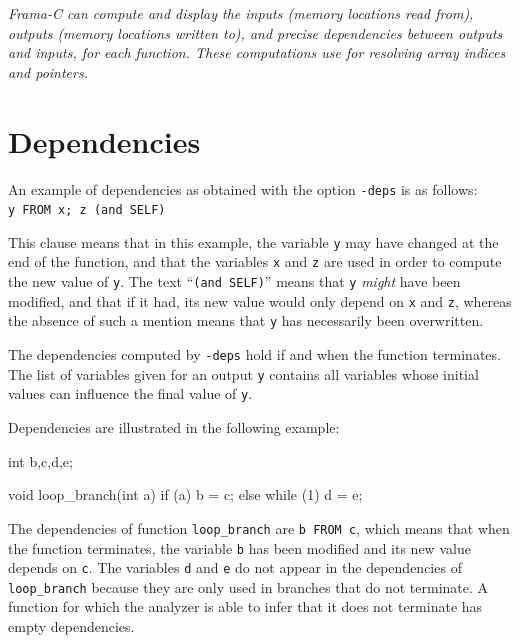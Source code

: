 \documentclass{frama-c-book}
\begin{document}
{\em Frama-C can compute and display the inputs (memory locations read from),
outputs (memory locations written to),
and precise dependencies between outputs and inputs,
for each function. These computations use \Eva{}
for resolving array indices and pointers.}

\vspace{2cm}


\section{Dependencies}
\label{sec:dependencies}
An example of dependencies as obtained with the option \lstinline|-deps| is
as follows:\\
\lstinline|y FROM x; z (and SELF)|

This clause means that in this example, the variable \lstinline|y| may have
changed at the end of the function, and that the variables \lstinline|x| and
\lstinline|z| are used in order to compute the new value of \lstinline|y|.
The text ``\lstinline|(and SELF)|'' means that \lstinline|y| {\em might}
have been modified, and that if it had, its new value would only depend
on \lstinline|x| and \lstinline|z|,  whereas the absence of such a mention
means that \lstinline|y| has necessarily been overwritten.

The dependencies computed by \lstinline|-deps| hold if and when the function
terminates. The list of variables given for an output \lstinline|y|
contains all variables whose initial values can influence the final value
of \lstinline|y|.

Dependencies are illustrated in the following example:

\begin{listing}{1}
int b,c,d,e;

void loop_branch(int a)
{
  if (a)
    b = c;
  else
    while (1) d = e;
}
\end{listing}

The dependencies of function \lstinline|loop_branch| are
\lstinline|b FROM c|, which means that when the
function terminates, the variable \lstinline|b| has been modified
and its new value depends on \lstinline|c|. The variables \lstinline|d| and \lstinline|e|
do not appear in the dependencies of \lstinline|loop_branch| because
they are only used in branches that do not terminate. A function
for which the analyzer is able to infer that it does not terminate
has empty dependencies.
\end{document}
